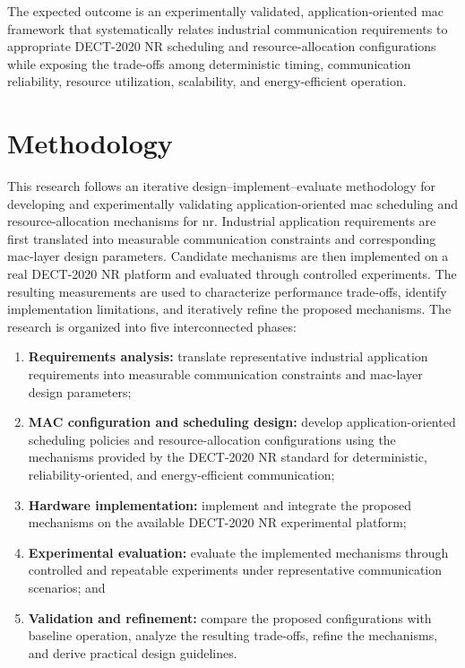 \documentclass[12pt,a4paper]{article}
\begin{document}
The expected outcome is an experimentally validated, application-oriented
\gls{mac} framework that systematically relates industrial communication
requirements to appropriate DECT-2020 NR scheduling and resource-allocation
configurations while exposing the trade-offs among deterministic timing,
communication reliability, resource utilization, scalability, and
energy-efficient operation.

\section{Methodology}
\label{sec:methodology}

This research follows an iterative design--implement--evaluate methodology for
developing and experimentally validating application-oriented \gls{mac}
scheduling and resource-allocation mechanisms for \gls{nr}. Industrial
application requirements are first translated into measurable communication
constraints and corresponding \gls{mac}-layer design parameters. Candidate
mechanisms are then implemented on a real DECT-2020 NR platform and evaluated
through controlled experiments. The resulting measurements are used to
characterize performance trade-offs, identify implementation limitations, and
iteratively refine the proposed mechanisms.
The research is organized into five interconnected phases:

\begin{enumerate}

\item \textbf{Requirements analysis:}
translate representative industrial application requirements into measurable
communication constraints and \gls{mac}-layer design parameters;

\item \textbf{MAC configuration and scheduling design:}
develop application-oriented scheduling policies and resource-allocation
configurations using the mechanisms provided by the DECT-2020 NR standard
for deterministic, reliability-oriented, and energy-efficient communication;

\item \textbf{Hardware implementation:}
implement and integrate the proposed mechanisms on the available DECT-2020 NR
experimental platform;

\item \textbf{Experimental evaluation:}
evaluate the implemented mechanisms through controlled and repeatable
experiments under representative communication scenarios; and

\item \textbf{Validation and refinement:}
compare the proposed configurations with baseline operation, analyze the
resulting trade-offs, refine the mechanisms, and derive practical design
guidelines.

\end{enumerate}
\end{document}
